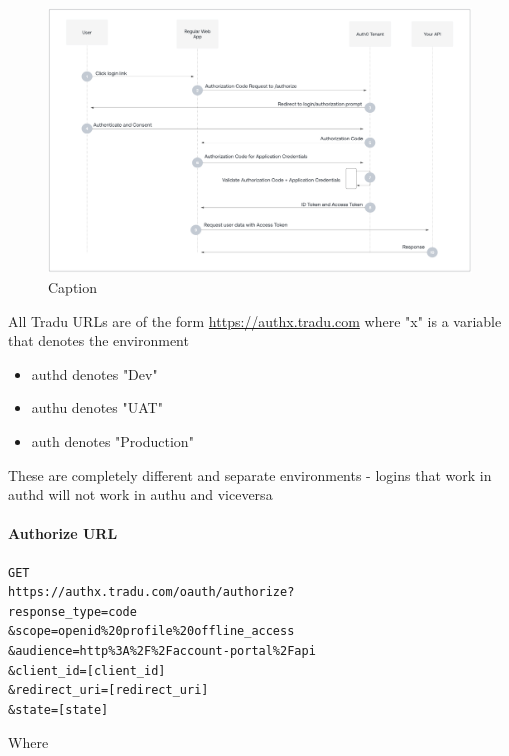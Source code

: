 \documentclass[11pt]{article}
\begin{document}
\begin{figure}[H]
    \centering
    \includegraphics[width=1.0\linewidth]{Auth-code-flow-diagram.png}
    \caption{Caption}
    \label{Auth0 Code Flow}
\end{figure}

All Tradu URLs are of the form \url{https://authx.tradu.com} where "x" is a variable that denotes the environment

\begin{itemize}
    \item authd denotes "Dev"
    \item authu denotes "UAT"
    \item auth denotes "Production"
\end{itemize}

These are completely different and separate environments - logins that work in authd will not work in authu and viceversa

\paragraph{Authorize URL}

\begin{verbatim}
GET
https://authx.tradu.com/oauth/authorize?
response_type=code
&scope=openid%20profile%20offline_access
&audience=http%3A%2F%2Faccount-portal%2Fapi
&client_id=[client_id]
&redirect_uri=[redirect_uri]
&state=[state]
\end{verbatim}

Where
\end{document}
